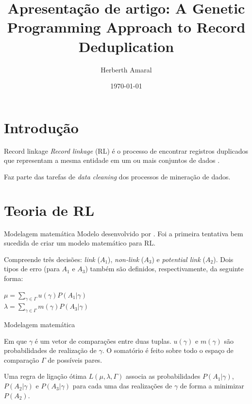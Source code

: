 \documentclass{beamer}
\title{Apresentação de artigo: A Genetic Programming Approach to Record Deduplication}
\date{\today}
\author{Herberth Amaral}
\institute{Programa de Pós-Graduação em Modelagem Computacional e Sistemas - UNIMONTES}
\begin{document}
  \maketitle

  \section{Introdução}

  \begin{frame}{Record linkage}
      \textit{Record linkage} (RL) é o processo de encontrar registros duplicados que representam a mesma entidade em um ou mais conjuntos de dados \cite{survey}.

      Faz parte das tarefas de \textit{data cleaning} dos processos de mineração de dados.
  \end{frame}

  \section{Teoria de RL}

  \begin{frame}{Modelagem matemática}
      Modelo desenvolvido por \cite{fellegi69}. Foi a primeira tentativa bem sucedida de criar um modelo matemático para RL.

      Compreende três decisões: \textit{link} ($A_1$), \textit{non-link} ($A_3$) e \textit{potential link} ($A_2$). Dois tipos de erro (para $A_1$ e $A_3$) também são definidos, respectivamente, da seguinte forma:

      \begin{center}
          $\mu = \sum\limits_{\gamma \in \Gamma} u(\gamma)P(A_1|\gamma)$ \\
          $\lambda = \sum\limits_{\gamma \in \Gamma} m(\gamma)P(A_3|\gamma)$
      \end{center}
  \end{frame}
  \begin{frame}{Modelagem matemática}

      Em que $\gamma$ é um vetor de comparações entre duas tuplas. $u(\gamma)$ e $m(\gamma)$ são probabilidades de realização de $\gamma$. O somatório é feito sobre todo o espaço de comparação $\Gamma$ de possíveis pares.

      Uma regra de ligação ótima $L(\mu,\lambda,\Gamma)$ associa as probabilidades $P(A_1|\gamma)$, $P(A_2|\gamma)$ e $P(A_3|\gamma)$ para cada uma das realizações de $\gamma$ de forma a minimizar $P(A_2)$.

  \end{frame}
\end{document}

